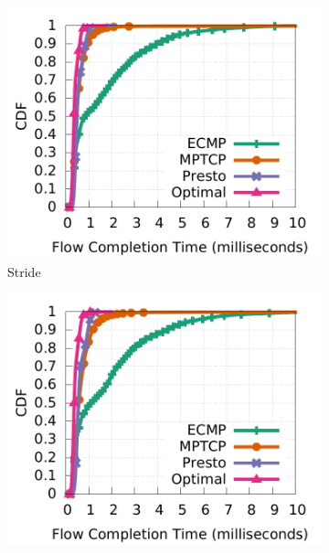 \begin{figure}[!t]
        \centering
	\begin{subfigure}[b]{0.3\textwidth}
                \centering
  		\includegraphics[width=\textwidth]{./figures/presto/macro/stride/macro_compare_fct_stride_mice.pdf}
        	\caption{Stride}
        	\label{macro_evaluation_fct_stride}
	\end{subfigure}
	\begin{subfigure}[b]{0.3\textwidth}
                \centering
		\includegraphics[width=\textwidth]{./figures/presto/macro/bijection/macro_compare_fct_bijection_mice.pdf}

\end{subfigure}
\end{figure}
